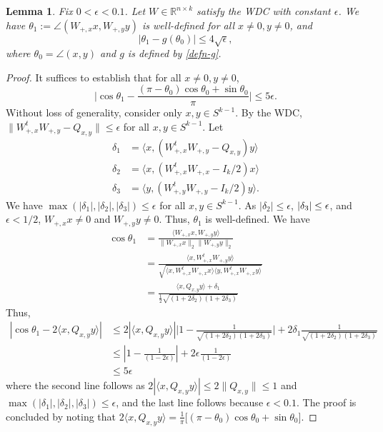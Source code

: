 \documentclass[11pt]{article}
\newtheorem{lemma}[theorem]{Lemma}
\newcommand{\R}{\mathbb{R}}
\newcommand{\eps}{\epsilon}
\newcommand{\spherek}{S^{k-1}}
\newcommand{\tran}{t}
\newcommand{\red}[1]{{\color{black} #1}}
\newcommand{\Wplus}[1]{W_{+, #1}}
\newcommand{\Wpx}{\Wplus{x}}
\newcommand{\Wpy}{\Wplus{y}}
\newcommand{\Wpxt}{\Wpx^\tran}
\newcommand{\Wpyt}{\Wpy^\tran}
\newcommand{\WpxtWpx}{\Wpx^\tran \Wpx}
\newcommand{\Qxy}{Q_{x,y}}
\begin{document}
\begin{lemma} \label{lemma:control-thetatwo} 
Fix $0 < \eps < 0.1$.  Let $W \in \R^{n \times k}$ satisfy the WDC with constant $\eps$.  We have
$\theta_1 := \angle( \Wpx x,  \Wpy y)$ is well-defined for all $x\neq0, y \neq0$,  and 
\[
| \theta_1 - g(\theta_0) | \leq 4 \sqrt{\eps},
\]
where $\theta_0 = \angle(x,y)$ and $g$ is defined by \eqref{defn-g}.
\end{lemma}
\begin{proof}
It suffices to establish that for all $x \neq 0, y \neq 0$,
\[
\Biggl |\cos \theta_1 -  \frac{(\pi - \theta_0) \cos \theta_0 + \sin \theta_0}{\pi} \Biggr | \leq 5 \eps.
\]
Without loss of generality, consider only $x, y \in \spherek$. 
By the WDC, $\|\Wpxt \Wpy - \Qxy \| \leq  \eps$ for all $x, y \in \spherek$.   Let 
\begin{align*}
\delta_1 &= \langle x, (\Wpxt \Wpy -  \Qxy) y \rangle\\
 \delta_2 &= \langle x, (\Wpxt \Wpx -  I_{k}/2) x\rangle\\
  \delta_3 &= \langle y, (\Wpyt \Wpy -  I_{k}/2) y \rangle.
\end{align*}
We have $\max(|\delta_1|, |\delta_2|, |\delta_3|) \leq \eps$ for all $x,y \in S^{k-1}$.   
As $|\delta_2|\leq \eps$, $|\delta_3| \leq \red{\eps}$, and $\eps < 1/2$, 
$ \Wpx x \neq 0$ and $\Wpy y \neq 0$.  Thus, $\theta_1$ is well-defined.  We have
\begin{align*}
\cos \theta_1  &= \frac{\langle \Wpx x, \Wpy y \rangle}{\| \Wpx x\|_2 \| \Wpy y\|_2} \\
&= \frac{\langle  x, \Wpxt \Wpy y \rangle}{\sqrt{ \langle x, \WpxtWpx x \rangle \langle y, \WpxtWpx y \rangle}}\\
&= \frac{\langle x, \Qxy y \rangle + \delta_1 }{\frac{1}{2} \sqrt{(1+2 \delta_2) (1 + 2 \delta_3)}}
\end{align*}
Thus, 
\begin{align*}
| \cos \theta_1 - 2 \langle x, \Qxy y \rangle | &\leq  2 |\langle x, \Qxy y\rangle| \Biggl |1 - \frac{1}{\sqrt{(1 + 2\delta_2) (1 + 2\delta_3)}} \Biggr| + 2 \delta_1 \frac{1}{\sqrt{(1+ 2\delta_2) (1 + 2\delta_3)}}  \\
& \leq  \left |1 - \frac{1}{(1 - 2 \eps)} \right | + 2 \eps \frac{1}{(1- 2 \eps)}  \\
& \leq 5\eps
\end{align*}
where the second line follows as $2 |\langle x, \Qxy y \rangle | \leq 2 \|\Qxy\| \leq 1$ and $\max(|\delta_1|, |\delta_2|, |\delta_3|) \leq \eps$, and the last line follows because $\eps < 0.1$.   The proof is concluded by noting that $2 \langle x, \Qxy y \rangle = \frac{1}{\pi} \bigl[ (\pi - \theta_0) \cos \theta_0 + \sin \theta_0 \bigr]$. 

\end{proof}
\end{document}
